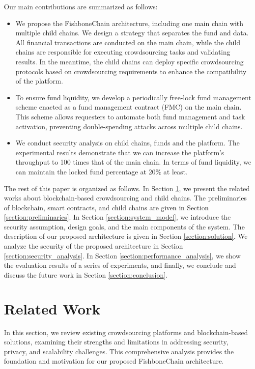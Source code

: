 \documentclass[10pt,journal]{IEEEtran}
\begin{document}
Our main contributions are summarized as follows:

\begin{itemize}
    \item We propose the FishboneChain architecture, including one main chain with multiple child chains. We design a strategy that separates the fund and data. All financial transactions are conducted on the main chain, while the child chains are responsible for executing crowdsourcing tasks and validating results. In the meantime, the child chains can deploy specific crowdsourcing protocols based on crowdsourcing requirements to enhance the compatibility of the platform.
    \item To ensure fund liquidity, we develop a periodically free-lock fund management scheme enacted as a fund management contract (FMC) on the main chain. This scheme allows requesters to automate both fund management and task activation, preventing double-spending attacks across multiple child chains.
    \item We conduct security analysis on child chains, funds and the platform.
    The experimental results demonstrate that we can increase the platform's throughput to 100 times that of the main chain. In terms of fund liquidity, we can maintain the locked fund percentage at 20\% at least.
\end{itemize}

The rest of this paper is organized as follows. In Section \ref{section:related_work}, we present the related works about blockchain-based crowdsourcing and child chains. The preliminaries of blockchain, smart contracts, and child chains are given in Section \ref{section:preliminaries}. In Section \ref{section:system_model}, we introduce the security assumption, design goals, and the main components of the system. The description of our proposed architecture is given in Section \ref{section:solution}. We analyze the security of the proposed architecture in Section \ref{section:security_analysis}. In Section \ref{section:performance_analysis}, we show the evaluation results of a series of experiments, and finally, we conclude and discuss the future work in Section \ref{section:conclusion}.

\section{Related Work} \label{section:related_work}

In this section, we review existing crowdsourcing platforms and blockchain-based solutions, examining their strengths and limitations in addressing security, privacy, and scalability challenges. This comprehensive analysis provides the foundation and motivation for our proposed FishboneChain architecture.
\end{document}
